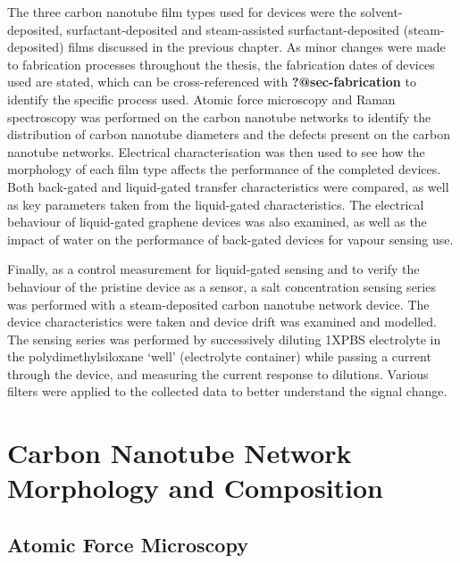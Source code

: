 \documentclass[
  a4paper,
]{scrbook}
\begin{document}
The three carbon nanotube film types used for devices were the
solvent-deposited, surfactant-deposited and steam-assisted
surfactant-deposited (steam-deposited) films discussed in the previous
chapter. As minor changes were made to fabrication processes throughout
the thesis, the fabrication dates of devices used are stated, which can
be cross-referenced with \textbf{?@sec-fabrication} to identify the
specific process used. Atomic force microscopy and Raman spectroscopy
was performed on the carbon nanotube networks to identify the
distribution of carbon nanotube diameters and the defects present on the
carbon nanotube networks. Electrical characterisation was then used to
see how the morphology of each film type affects the performance of the
completed devices. Both back-gated and liquid-gated transfer
characteristics were compared, as well as key parameters taken from the
liquid-gated characteristics. The electrical behaviour of liquid-gated
graphene devices was also examined, as well as the impact of water on
the performance of back-gated devices for vapour sensing use.

Finally, as a control measurement for liquid-gated sensing and to verify
the behaviour of the pristine device as a sensor, a salt concentration
sensing series was performed with a steam-deposited carbon nanotube
network device. The device characteristics were taken and device drift
was examined and modelled. The sensing series was performed by
successively diluting 1XPBS electrolyte in the polydimethylsiloxane
`well' (electrolyte container) while passing a current through the
device, and measuring the current response to dilutions. Various filters
were applied to the collected data to better understand the signal
change.

\hypertarget{sec-pristine-morphology}{%
\section{Carbon Nanotube Network Morphology and
Composition}\label{sec-pristine-morphology}}

\hypertarget{sec-pristine-AFM}{%
\subsection{Atomic Force Microscopy}\label{sec-pristine-AFM}}
\end{document}
